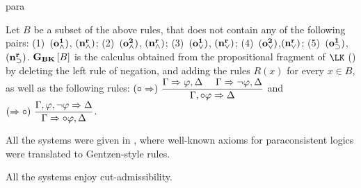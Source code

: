 \begin{entry}{para}
 \begin{clarifications}
Let $B$ be a subset of the above rules, that  does not contain any of the
following pairs: 
{{\rm (1)}~${\bf (o^1_\wedge)}$, ${\bf (n^r_\wedge)}$;}
{{\rm (2)}~${\bf (o^2_\wedge)}$, ${\bf (n^r_\wedge)}$;}
{{\rm (3)}~${\bf (o^1_\vee)}$, ${\bf (n^r_\vee)}$;}
{{\rm (4)}~${\bf (o^2_\vee)}$,${\bf (n^r_\vee)}$;}
{{\rm (5)}~${\bf (o^1_\supset)}$, ${\bf (n^r_\supset)}$.}
${{\bf G}_{\bf BK}}\left[B\right]$ is the calculus obtained from the propositional fragment of $\LK$ () by deleting the left rule of negation, and adding the rules $R(x)$ for every $x\in B$, as well as  the following rules:
\footnotesize$
(\circ\Rightarrow)~\dfrac{\Gamma\Rightarrow\varphi,\Delta~~~~ \Gamma\Rightarrow\neg\varphi,\Delta}{\Gamma,\circ\varphi\Rightarrow\Delta} $
\normalsize and \footnotesize
$(\Rightarrow\circ)~\dfrac{\Gamma,\varphi,\neg\varphi\Rightarrow\Delta}{\Gamma\Rightarrow\circ\varphi,\Delta}
$.	
 \end{clarifications}

 \begin{history}
All the systems were given in \cite{AKZ12,Avron2015}, where well-known axioms for paraconsistent logics were translated to Gentzen-style rules.
 \end{history}

 \begin{technicalities}
All the systems enjoy cut-admissibility.
 \end{technicalities}



%
%
%
%
%
%
% 
%





\end{entry}
